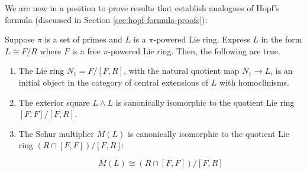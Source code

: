 We are now in a position to prove results that establish analogues of
Hopf's formula (discussed in Section \ref{sec:hopf-formula-proofs}):

\begin{theorem}
  Suppose $\pi$ is a set of primes and $L$ is a $\pi$-powered
   Lie ring. Express $L$ in the form $L \cong F/R$ where $F$ is
  a free $\pi$-powered Lie ring. Then, the following are true.

  \begin{enumerate}
  \item The Lie ring $N_1 = F/[F,R]$, with the natural quotient map $N_1
    \to L$, is an initial object in the category of central extensions
    of $L$ with homoclinisms.
  \item The exterior square $L \wedge L$ is canonically isomorphic to
    the quotient Lie ring $[F,F]/[F,R]$.
  \item The Schur multiplier $M(L)$ is canonically isomorphic to the
    quotient Lie ring $(R \cap [F,F])/[F,R]$:

    \begin{equation}\label{eq:pi-powered-hopf-formula-lie}
      M(L) \cong (R \cap [F,F])/[F,R]
    \end{equation}
  \end{enumerate}
\end{theorem}

